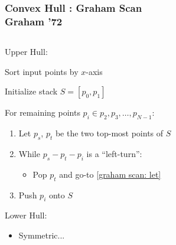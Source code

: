 \documentclass[english, aspectratio=169]{beamer}
\begin{document}
\begin{frame}
  \frametitle{Convex Hull : Graham Scan\\Graham '72}

  \begin{columns}
    \begin{column}{0.6\linewidth}
      Upper Hull:
      \begin{itemize}
         {
        \item Sort input points by $x$-axis
        }
         {
        \item Initialize stack $S = [p_0, p_1]$
        }
         {
        \item For remaining points $p_i \in p_2, p_3, \dots, p_{N-1}$:
          \begin{enumerate}
          \item\label{graham scan: let}
            Let $p_s$, $p_t$ be the two top-most points of $S$

          \item While $p_s - p_t - p_i$ is a ``left-turn'':
            \begin{itemize}
            \item Pop $p_t$ and go-to \ref{graham scan: let}
            \end{itemize}

          \item Push $p_i$ onto $S$
          \end{enumerate}
        }
      \end{itemize}

       {
        Lower Hull:
        \begin{itemize}
        \item Symmetric...
        \end{itemize}
      }
    \end{column}
    \begin{column}{0.4\linewidth}
      \begin{figure}
        \centering
\end{figure}
\end{column}
\end{columns}
\end{frame}
\end{document}
